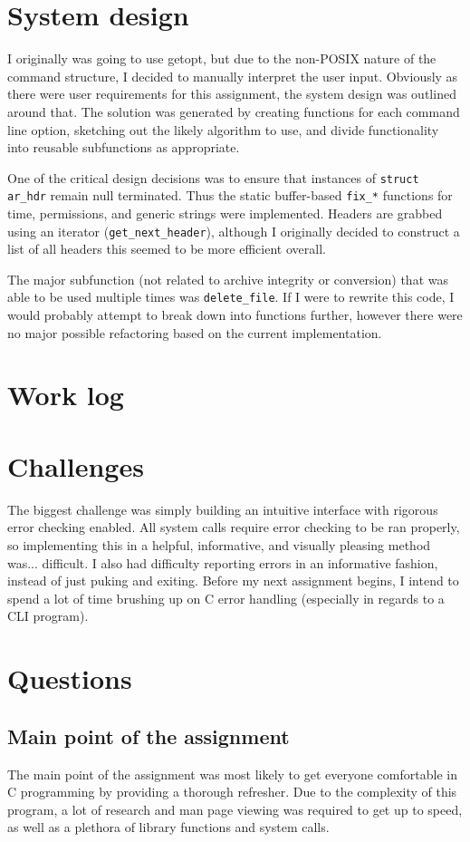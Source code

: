 \documentclass[letterpaper,10pt,titlepage]{article}
\begin{document}
\section{System design}
I originally was going to use getopt, but due to the non-POSIX nature of the command
structure, I decided to manually interpret the user input. Obviously as there were user
requirements for this assignment, the system design was outlined around that. The solution
was generated by creating functions for each command line option, sketching out the likely
algorithm to use, and divide functionality into reusable subfunctions as appropriate.

One of the critical design decisions was to ensure that instances of \verb!struct ar_hdr!
remain null terminated. Thus the static buffer-based \verb!fix_*! functions for
time, permissions, and generic strings were implemented. Headers are grabbed using
an iterator (\verb~get_next_header~), although I originally decided to construct a list
of all headers this seemed to be more efficient overall.

The major subfunction (not related to archive integrity or conversion) that was able to
be used multiple times was \verb!delete_file!. If I were to rewrite this code, I would
probably attempt to break down into functions further, however there were no major possible
refactoring based on the current implementation.

\section{Work log}

\section{Challenges}
The biggest challenge was simply building an intuitive interface with rigorous error
checking enabled. All system calls require error checking to be ran properly, so
implementing this in a helpful, informative, and visually pleasing method was... difficult.
I also had difficulty reporting errors in an informative fashion, instead of just puking
and exiting. Before my next assignment begins, I intend to spend a lot of time brushing
up on C error handling (especially in regards to a CLI program).

\section{Questions}
\subsection{Main point of the assignment} 
The main point of the assignment was most likely to get everyone comfortable in C
programming by providing a thorough refresher. Due to the complexity of this program,
a lot of research and man page viewing was required to get up to speed, as well as
a plethora of library functions and system calls.
\end{document}
